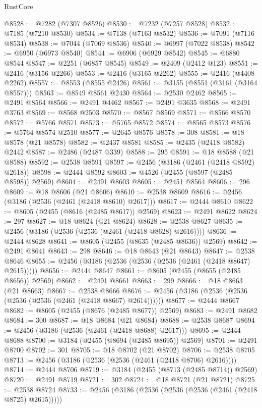 \begin{lexlean}{RustCore}
\begin{coremodule}
@8528 := @7282 (@7307 @8526)
@8530 := @7232 (@7257 @8528)
@8532 := @7185 (@7210 @8530)
@8534 := @7138 (@7163 @8532)
@8536 := @7091 (@7116 @8534)
@8538 := @7044 (@7069 @8536)
@8540 := @6997 (@7022 @8538)
@8542 := @6950 (@6973 @8540)
@8544 := @6906 (@6929 @8542)
@8545 := @6880 @8544
@8547 := @2251 (@6857 @8545)
@8549 := @2409 (@2412 @123)
@8551 := @2416 (@3156 @2266)
@8553 := @2416 (@3165 @2262)
@8555 := @2416 (@4408 @2262)
@8557 := @8553 (@8555 @2426)
@8561 := @3155 (@8551 (@3161 (@3164 @8557)))
@8563 := @8549 @8561 @2430
@8564 := @2530 @2462
@8565 := @2491 @8564
@8566 := @2491 @4462
@8567 := @2491 @3635
@8568 := @2491 @3763
@8569 := @8568 @2503
@8570 := @8567 @8569
@8571 := @8566 @8570
@8572 := @5766 @8571
@8573 := @5765 @8572
@8574 := @8565 @8573
@8576 := @5764 @8574 @2510
@8577 := @2645 @8576
@8578 := 308
@8581 := @18 @8578 (@21 @8578)
@8582 := @2437 @8581
@8585 := @2435 (@2418 @8582) @2442
@8587 := @2486 (@2487 @339)
@8588 := 295
@8591 := @18 @8588 (@21 @8588)
@8592 := @2538 @8591
@8597 := @2456 (@3186 (@2461 (@2418 @8592) @2618))
@8598 := @2444 @8592
@8603 := @4526 (@2455 (@8597 (@2485 @8598)) @2569)
@8604 := @2491 @8603
@8605 := @2451 @8564
@8606 := 296
@8609 := @18 @8606 (@21 @8606)
@8610 := @2538 @8609
@8616 := @2456 (@3186 (@2536 (@2461 (@2418 @8610) @2617)))
@8617 := @2444 @8610
@8622 := @8605 (@2455 (@8616 (@2485 @8617)) @2569)
@8623 := @2491 @8622
@8624 := 297
@8627 := @18 @8624 (@21 @8624)
@8628 := @2538 @8627
@8635 := @2456 (@3186 (@2536 (@2536 (@2461 (@2418 @8628) @2616))))
@8636 := @2444 @8628
@8641 := @8605 (@2455 (@8635 (@2485 @8636)) @2569)
@8642 := @2491 @8641
@8643 := 298
@8646 := @18 @8643 (@21 @8643)
@8647 := @2538 @8646
@8655 := @2456 (@3186 (@2536 (@2536 (@2536 (@2461 (@2418 @8647) @2615)))))
@8656 := @2444 @8647
@8661 := @8605 (@2455 (@8655 (@2485 @8656)) @2569)
@8662 := @2491 @8661
@8663 := 299
@8666 := @18 @8663 (@21 @8663)
@8667 := @2538 @8666
@8676 := @2456 (@3186 (@2536 (@2536 (@2536 (@2536 (@2461 (@2418 @8667) @2614))))))
@8677 := @2444 @8667
@8682 := @8605 (@2455 (@8676 (@2485 @8677)) @2569)
@8683 := @2491 @8682
@8684 := 300
@8687 := @18 @8684 (@21 @8684)
@8688 := @2538 @8687
@8694 := @2456 (@3186 (@2536 (@2461 (@2418 @8688) @2617)))
@8695 := @2444 @8688
@8700 := @3184 (@2455 (@8694 (@2485 @8695)) @2569)
@8701 := @2491 @8700
@8702 := 301
@8705 := @18 @8702 (@21 @8702)
@8706 := @2538 @8705
@8713 := @2456 (@3186 (@2536 (@2536 (@2461 (@2418 @8706) @2616))))
@8714 := @2444 @8706
@8719 := @3184 (@2455 (@8713 (@2485 @8714)) @2569)
@8720 := @2491 @8719
@8721 := 302
@8724 := @18 @8721 (@21 @8721)
@8725 := @2538 @8724
@8733 := @2456 (@3186 (@2536 (@2536 (@2536 (@2461 (@2418 @8725) @2615)))))

\end{coremodule}
\end{lexlean}

